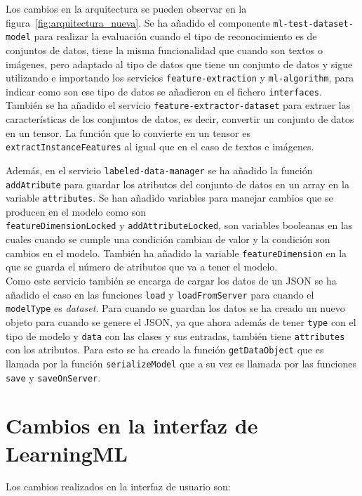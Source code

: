 \documentclass[a4paper, 12pt]{book}
\begin{document}
Los cambios en la arquitectura se pueden observar en la figura~\ref{fig:arquitectura_nueva}. 
Se ha añadido el componente \texttt{ml-test-dataset-model} para realizar la evaluación cuando el tipo de reconocimiento es de conjuntos de datos, tiene la misma funcionalidad que cuando son textos o imágenes, pero adaptado al tipo de datos que tiene un conjunto de datos y sigue utilizando e importando los servicios \texttt{feature-extraction} y \texttt{ml-algorithm}, para indicar como son ese tipo de datos se añadieron en el fichero \texttt{interfaces}. \\
También se ha añadido el servicio \texttt{feature-extractor-dataset} para extraer las características de los conjuntos de datos, es decir, convertir un conjunto de datos en un tensor. 
La función que lo convierte en un tensor es \texttt{extractInstanceFeatures} al igual que en el caso de textos e imágenes.

Además, en el servicio \texttt{labeled-data-manager} se ha añadido la función \texttt{addAtribute} para guardar los atributos del conjunto de datos en un array en la variable \texttt{attributes}. 
Se han añadido variables para manejar cambios que se producen en el modelo como son \\ \texttt{featureDimensionLocked} y \texttt{addAttributeLocked}, son variables booleanas en las cuales cuando se cumple una condición cambian de valor y la condición son cambios en el modelo. 
También ha añadido la variable \texttt{featureDimension} en la que se guarda el número de atributos que va a tener el modelo. \\
Como este servicio también se encarga de cargar los datos de un JSON se ha añadido el caso en las funciones \texttt{load} y \texttt{loadFromServer} para cuando el \texttt{modelType} es \emph{dataset}. 
Para cuando se guardan los datos se ha creado un nuevo objeto para cuando se genere el JSON, ya que ahora además de tener \texttt{type} con el tipo de modelo y \texttt{data} con las clases y sus entradas, también tiene \texttt{attributes} con los atributos. 
Para esto se ha creado la función \texttt{getDataObject} que es llamada por la función \texttt{serializeModel} que a su vez es llamada por las funciones \texttt{save} y \texttt{saveOnServer}.


\section{Cambios en la interfaz de LearningML} 
\label{sec:interfaz}

Los cambios realizados en la interfaz de usuario son:
\end{document}
